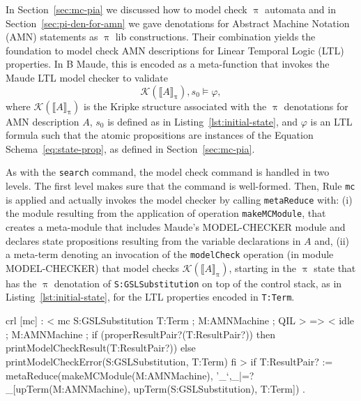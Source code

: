 \documentclass[a4paper,openany]{book}
\begin{document}
In Section~\ref{sec:mc-pia} we discussed how to model check $\uppi$ automata and in Section~\ref{sec:pi-den-for-amn} we gave denotations for Abstract Machine Notation (AMN) statements as $\uppi$ lib constructions. Their combination yields the foundation to model check AMN descriptions for Linear Temporal Logic (LTL) properties. In B Maude, this is encoded as a meta-function that invokes the Maude LTL model checker to validate 
\[
\mathcal{K}(\llbracket \mathit{A} \rrbracket_\uppi), s_0 \models \varphi,
\]
where $\mathcal{K}(\llbracket \mathit{A} \rrbracket_\uppi)$ is the Kripke structure associated with the $\uppi$ denotations for AMN description $A$, $s_0$ is defined as in Listing~\ref{lst:initial-state}, and $\varphi$ is an LTL formula such that the atomic propositions are instances of the Equation Schema~\ref{eq:state-prop}, as defined in Section~\ref{sec:mc-pia}.

As with the \texttt{search} command, the model check command is handled in two levels. The first level makes sure that the command is well-formed. Then, Rule \texttt{mc} is applied and actually invokes the model checker by calling \texttt{metaReduce} with: (i) the module resulting from the application of operation \texttt{makeMCModule}, that creates a meta-module that  includes Maude's MODEL-CHECKER module and declares state propositions resulting from the variable declarations in $A$ and, (ii) a meta-term denoting an invocation of the \texttt{modelCheck} operation (in module MODEL-CHECKER) that model checks $\mathcal{K}(\llbracket \mathit{A} \rrbracket_\uppi)$, starting in the $\uppi$ state that has the $\uppi$ denotation of \texttt{S:GSLSubstitution} on top of the control stack, as in Listing~\ref{lst:initial-state}, for the LTL properties encoded in \texttt{T:Term}.
\begin{maude}[caption=]
crl [mc] :
     < mc S:GSLSubstitution T:Term ; M:AMNMachine ; QIL > =>
     < idle ; M:AMNMachine ;
             if (properResultPair?(T:ResultPair?)) 
             then printModelCheckResult(T:ResultPair?))	       
             else printModelCheckError(S:GSLSubstitution, T:Term) 
             fi >
if T:ResultPair? :=
   metaReduce(makeMCModule(M:AMNMachine),
     '_`,_|=?_[upTerm(M:AMNMachine), upTerm(S:GSLSubstitution), T:Term]) .
\end{maude}

\end{document}
